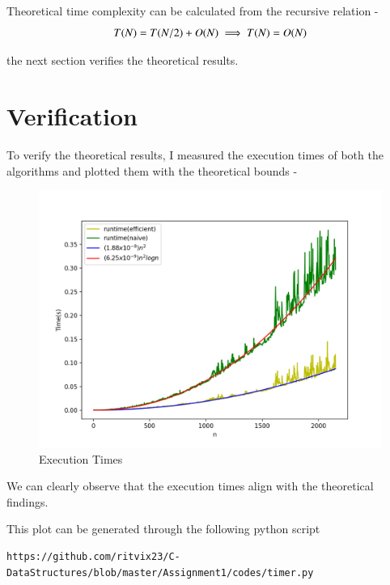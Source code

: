 \documentclass[journal,12pt,twocolumn]{IEEEtran}
\begin{document}
Theoretical time complexity can be calculated from the recursive relation - 
\begin{equation}
    T(N)  = T(N/2) + O(N) \label{eq:runtime_qselect}\\
    \implies T(N) = O(N)
\end{equation}

the next section  verifies the theoretical results. 
\section{Verification}
To verify the theoretical results, I measured the execution times of both the algorithms and plotted them with the theoretical bounds - 

\begin{figure}[!h]
    \centering
    \includegraphics[scale=0.5]{plots/verification.png}
    \caption{Execution Times}
    \label{fig:verification}
\end{figure}

We can clearly observe that the execution times align with the theoretical findings.

This plot can be generated through the following python script
\begin{lstlisting}
https://github.com/ritvix23/C-DataStructures/blob/master/Assignment1/codes/timer.py
\end{lstlisting}
\end{document}
